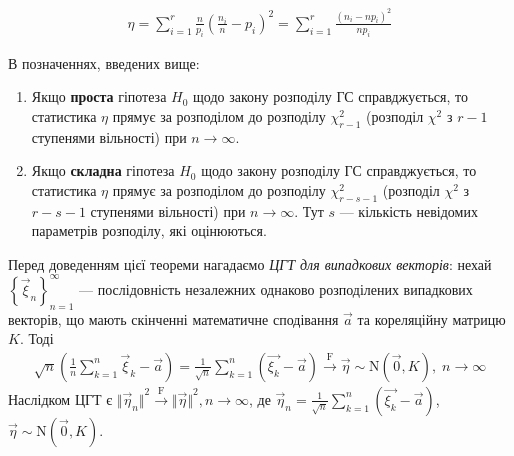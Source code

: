 \begin{gather*}
    \eta = \sum_{i=1}^r \frac{n}{p_i}\left(\frac{n_i}{n} - p_i \right)^2 = \sum_{i=1}^r \frac{\left(n_i - np_i\right)^2}{np_i}
\end{gather*}
\begin{theorem*}
    В позначеннях, введених вище:
    \begin{enumerate}
        \item Якщо \textbf{проста} гіпотеза $H_0$ щодо закону розподілу ГС справджується,
        то статистика $\eta$ прямує за розподілом до розподілу $\chi^2_{r-1}$ (розподіл $\chi^2$ з $r-1$ ступенями вільності) при $n\to\infty$.
        \item Якщо \textbf{складна} гіпотеза $H_0$ щодо закону розподілу ГС справджується,
        то статистика $\eta$ прямує за розподілом до розподілу $\chi^2_{r-s-1}$ (розподіл $\chi^2$ з $r-s-1$ ступенями вільності) при $n\to\infty$. Тут $s$ --- кількість
        невідомих параметрів розподілу, які оцінюються.
    \end{enumerate}    
\end{theorem*}
Перед доведенням цієї теореми нагадаємо \emph{ЦГТ для випадкових векторів}: нехай $\left\{ \vec{\xi}_n\right\}_{n=1}^{\infty}$ --- послідовність незалежних однаково розподілених випадкових векторів, що мають скінченні
математичне сподівання $\vec{a}$ та кореляційну матрицю $K$. Тоді
\begin{gather}\label{th:clt_vect}
    \sqrt{n}\left( \frac{1}{n} \sum\limits_{k=1}^n \vec{\xi}_k - \vec{a}\right) = 
    \frac{1}{\sqrt{n}} \sum\limits_{k=1}^n \left( \vec{\xi_k} - \vec{a}\right) \overset{\mathrm{F}}{\longrightarrow} \vec{\eta} \sim \mathrm{N}\left(\vec{0}, K\right), \; n\to\infty
\end{gather}
Наслідком ЦГТ є ${\Vert \vec{\eta}_n \Vert}^2 \overset{\mathrm{F}}{\longrightarrow} {\Vert \vec{\eta} \Vert}^2, n\to\infty$, де
$\vec{\eta}_n = \frac{1}{\sqrt{n}} \sum\limits_{k=1}^n \left( \vec{\xi_k} - \vec{a}\right)$, $\vec{\eta} \sim \mathrm{N}\left(\vec{0}, K\right)$.

